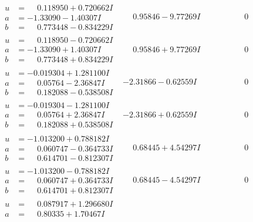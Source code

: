 \documentclass[1p]{elsarticle_modified}
\theoremstyle{definition}
\begin{document}
$$\begin{array}{c|c|c}
 \hline 
\begin{aligned}
u &= \phantom{-}0.118950 + 0.720662 I \\
a &= -1.33090 - 1.40307 I \\
b &= \phantom{-}0.773448 - 0.834229 I\end{aligned}
 & \phantom{-}0.95846 - 9.77269 I & \phantom{-0.000000 } 0 \\ \hline\begin{aligned}
u &= \phantom{-}0.118950 - 0.720662 I \\
a &= -1.33090 + 1.40307 I \\
b &= \phantom{-}0.773448 + 0.834229 I\end{aligned}
 & \phantom{-}0.95846 + 9.77269 I & \phantom{-0.000000 } 0 \\ \hline\begin{aligned}
u &= -0.019304 + 1.281100 I \\
a &= \phantom{-}0.05764 - 2.36847 I \\
b &= \phantom{-}0.182088 - 0.538508 I\end{aligned}
 & -2.31866 - 0.62559 I & \phantom{-0.000000 } 0 \\ \hline\begin{aligned}
u &= -0.019304 - 1.281100 I \\
a &= \phantom{-}0.05764 + 2.36847 I \\
b &= \phantom{-}0.182088 + 0.538508 I\end{aligned}
 & -2.31866 + 0.62559 I & \phantom{-0.000000 } 0 \\ \hline\begin{aligned}
u &= -1.013200 + 0.788182 I \\
a &= \phantom{-}0.060747 - 0.364733 I \\
b &= \phantom{-}0.614701 - 0.812307 I\end{aligned}
 & \phantom{-}0.68445 + 4.54297 I & \phantom{-0.000000 } 0 \\ \hline\begin{aligned}
u &= -1.013200 - 0.788182 I \\
a &= \phantom{-}0.060747 + 0.364733 I \\
b &= \phantom{-}0.614701 + 0.812307 I\end{aligned}
 & \phantom{-}0.68445 - 4.54297 I & \phantom{-0.000000 } 0 \\ \hline\begin{aligned}
u &= \phantom{-}0.087917 + 1.296680 I \\
a &= \phantom{-}0.80335 + 1.70467 I \\

\end{aligned}
\end{array}$$
\end{document}
